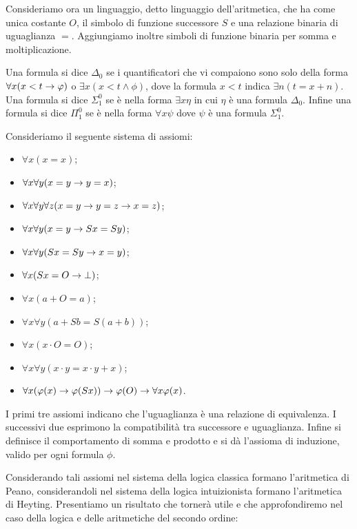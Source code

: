 \documentclass[]{marticle}
\begin{document}
Consideriamo ora un linguaggio, detto linguaggio dell'aritmetica, che ha come
unica costante $O$, il simbolo di funzione successore $S$ e una relazione
binaria di uguaglianza $=$.
Aggiungiamo inoltre simboli di funzione binaria per somma e moltiplicazione.

Una formula si dice $\Delta_0$ se i quantificatori che vi compaiono sono solo
della forma $\forall x (x < t \rightarrow \varphi)$ o $\exists x (x < t \land \phi)$, dove
la formula $x<t$ indica $\exists n (t = x+n)$. Una formula si dice $\Sigma^0_1$
se \`e nella forma $\exists x \eta$ in cui $\eta$ \`e una formula $\Delta_0$.
Infine una formula si dice $\Pi^0_1$ se \`e nella forma $\forall x \psi$ dove
$\psi$ \`e una formula $\Sigma^0_1$.

Consideriamo il seguente sistema di assiomi:
\begin{itemize}
    \item $\forall x (x=x)$;
    \item $\forall x \forall y (x=y\rightarrow y=x)$;
    \item $\forall x \forall y \forall z (x=y \rightarrow y=z \rightarrow x=z)$;
    \item $\forall x \forall y (x=y \rightarrow Sx=Sy)$;
    \item $\forall x \forall y (Sx=Sy \rightarrow x=y)$;
    \item $\forall x (Sx=O \rightarrow \bot)$;
    \item $\forall x (a+O = a)$;
    \item $\forall x \forall y (a+Sb = S(a+b))$;
    \item $\forall x (x\cdot O = O)$;
    \item $\forall x \forall y (x\cdot y = x\cdot y + x)$;
    \item $\forall x (\varphi(x) \rightarrow \varphi(Sx)) \rightarrow \varphi(O) \rightarrow \forall x
        \varphi(x)$.
\end{itemize}

I primi tre assiomi indicano che l'uguaglianza \`e una relazione di equivalenza.
I successivi due esprimono la compatibilit\`a tra successore e uguaglianza.
Infine si definisce il comportamento di somma e prodotto e si d\`a l'assioma di
induzione, valido per ogni formula $\phi$.

Considerando tali assiomi nel sistema della logica classica formano l'aritmetica
di Peano, considerandoli nel sistema della logica intuizionista formano
l'aritmetica di Heyting. Presentiamo un risultato che torner\`a utile e che
approfondiremo nel caso della logica e delle aritmetiche del secondo ordine:
\end{document}
